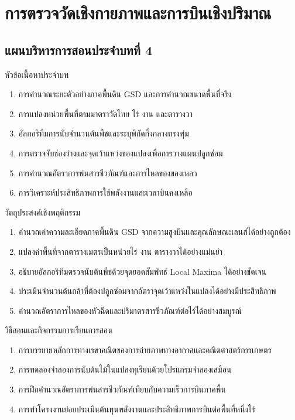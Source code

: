 \chapter{การตรวจวัดเชิงกายภาพและการบินเชิงปริมาณ}
\label{chap:ch04}

\section*{แผนบริหารการสอนประจำบทที่ 4}

\begin{planbox}{หัวข้อเนื้อหาประจำบท}
\begin{enumerate}
    \item การคำนวณระยะตัวอย่างภาคพื้นดิน GSD และการคำนวณขนาดพื้นที่จริง
    \item การแปลงหน่วยพื้นที่ตามมาตราวัดไทย ไร่ งาน และตารางวา
    \item อัลกอริทึมการนับจำนวนต้นพืชและระบุพิกัดกึ่งกลางทรงพุ่ม
    \item การตรวจจับช่องว่างและจุดเว้าแหว่งของแปลงเพื่อการวางแผนปลูกซ่อม
    \item การคำนวณอัตราการพ่นสารชีวภัณฑ์และการไหลของของเหลว
    \item การวิเคราะห์ประสิทธิภาพการใช้พลังงานและเวลาบินคงเหลือ
\end{enumerate}
\end{planbox}

\begin{planbox}{วัตถุประสงค์เชิงพฤติกรรม}
\begin{enumerate}
    \item คำนวณค่าความละเอียดภาคพื้นดิน GSD จากความสูงบินและคุณลักษณะเลนส์ได้อย่างถูกต้อง
    \item แปลงค่าพื้นที่จากตารางเมตรเป็นหน่วยไร่ งาน ตารางวาได้อย่างแม่นยำ
    \item อธิบายอัลกอริทึมตรวจนับต้นพืชด้วยจุดยอดสัมพัทธ์ Local Maxima ได้อย่างชัดเจน
    \item ประเมินจำนวนต้นกล้าที่ต้องปลูกซ่อมจากอัตราจุดเว้าแหว่งในแปลงได้อย่างมีประสิทธิภาพ
    \item คำนวณอัตราการไหลของหัวฉีดและปริมาตรสารชีวภัณฑ์ต่อไร่ได้อย่างสมบูรณ์
\end{enumerate}
\end{planbox}

\newpage

\begin{planbox}{วิธีสอนและกิจกรรมการเรียนการสอน}
\begin{enumerate}
    \item การบรรยายหลักการทางเรขาคณิตของการถ่ายภาพทางอากาศและคณิตศาสตร์การเกษตร
    \item การทดลองจำลองการนับต้นไม้ในแปลงทุเรียนด้วยโปรแกรมจำลองเสมือน
    \item การฝึกคำนวณอัตราการพ่นสารชีวภัณฑ์เทียบกับความเร็วการบินภาคพื้น
    \item การทำโครงงานย่อยประเมินต้นทุนพลังงานและประสิทธิภาพการบินต่อพื้นที่หนึ่งไร่
\end{enumerate}
\end{planbox}

